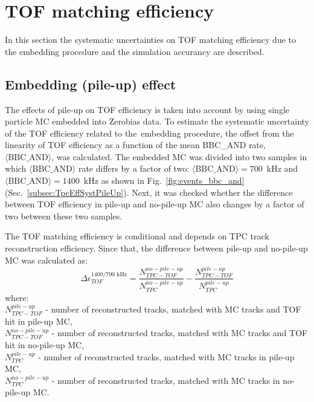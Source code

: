 \section{TOF matching efficiency}\label{sec:tofSystematics}
In this section the systematic uncertainties on TOF matching efficiency due to the embedding procedure and the simulation accurancy are described.
\subsection{Embedding (pile-up) effect}\label{sec:tofSystematicsPileUpEffect}
The effects of pile-up on TOF efficiency is taken into account by using single particle MC embedded into Zerobias data. To estimate the systematic uncertainty of the TOF efficiency related to the~embedding procedure, the offset from the linearity of TOF efficiency  as a function of the mean BBC\_AND rate, $\langle\text{BBC\_AND}\rangle$, was calculated. The embedded MC was divided into two samples in which $\langle\text{BBC\_AND}\rangle$ rate differs by a factor of two: \mbox{$\langle\text{BBC\_AND}\rangle=700$~kHz} and \mbox{$\langle\text{BBC\_AND}\rangle=1400$~kHz} as shown in Fig.~\ref{fig:events_bbc_and} (Sec.~\ref{subsec:TpcEffSystPileUp}).
Next, it was checked whether the difference between TOF efficiency in pile-up and no-pile-up MC also changes by a factor of two between these two samples.

\noindent
The TOF matching efficiency is conditional and depends on TPC track reconstruction efficiency. Since that, the difference between pile-up and  no-pile-up MC was calculated as:
\begin{equation}
\Delta\epsilon_{ TOF}^{1400/700\text{ kHz}}=\frac{N_{TPC-TOF}^{no-pile-up}}{N_{TPC}^{no-pile-up}}-\frac{N_{TPC-TOF}^{pile-up}}{N_{TPC}^{pile-up}}
\label{eq:tofSyst}
\end{equation}
where:\\
$N_{TPC-TOF}^{pile-up}$ - number of reconstructed tracks, matched with MC tracks and TOF hit in pile-up MC,\\
$N_{TPC-TOF}^{no-pile-up}$ - number of reconstructed tracks, matched with MC tracks and TOF hit in no-pile-up MC,\\
$N_{TPC}^{pile-up}$ - number of reconstructed tracks, matched with MC tracks in pile-up MC,\\
$N_{TPC}^{no-pile-up}$ - number of reconstructed tracks, matched with MC tracks in no-pile-up MC.
\newline

